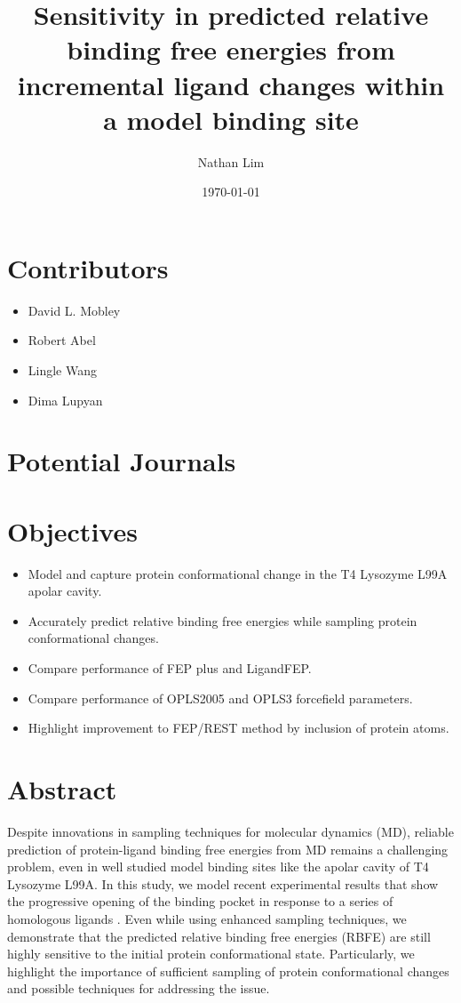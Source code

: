 \documentclass{article}
\begin{document}
\title{Sensitivity in predicted relative binding free energies from incremental ligand changes within a model binding site}
\date{\today}
\author{Nathan Lim}
\maketitle

\section*{Contributors}
\begin{itemize}
   \item David L. Mobley
   \item Robert Abel
   \item Lingle Wang
   \item Dima Lupyan
\end{itemize}

\section*{Potential Journals}

\section*{Objectives}
\begin{itemize}
   \item Model and capture protein conformational change in the T4 Lysozyme L99A apolar cavity.
   \item Accurately predict relative binding free energies while sampling protein conformational changes.
   \item Compare performance of FEP plus \cite{FEPplus} and LigandFEP.
   \item Compare performance of OPLS2005 and OPLS3 forcefield parameters.
   \item Highlight improvement to FEP/REST \cite{REST2} method by inclusion of protein atoms.
\end{itemize}


\section*{Abstract}
Despite innovations in sampling techniques for molecular dynamics (MD), reliable prediction of protein-ligand binding free energies from MD remains a challenging problem, even in well studied model binding sites like the apolar cavity of T4 Lysozyme L99A\cite{Boyce2009}. In this study, we model recent experimental results that show the progressive opening of the binding pocket in response to a series of homologous ligands \cite{Merski2015}. Even while using enhanced sampling techniques, we demonstrate that the predicted relative binding free energies (RBFE) are still highly sensitive to the initial protein conformational state. Particularly, we highlight the importance of sufficient sampling of protein conformational changes and possible techniques for addressing the issue.
\end{document}
